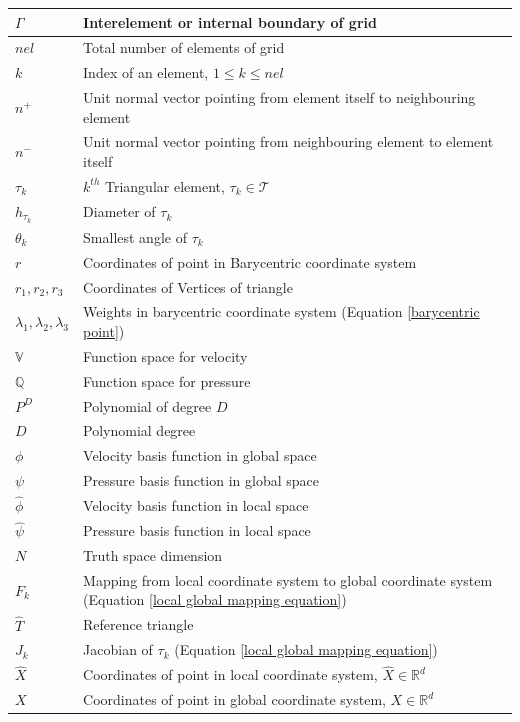 \documentclass[a4paper]{book}
\begin{document}
\begin{longtable}{| p{} | p{} |}
\hline
$\Gamma$ & Interelement or internal boundary of grid\\
\hline
$nel$ & Total number of elements of grid\\
\hline
$k$ & Index of an element, $1\leq k \leq nel$\\
\hline
$n^+$ & Unit normal vector pointing from element itself to neighbouring element\\
\hline
$n^-$ & Unit normal vector pointing from neighbouring element to element itself \\
\hline
$\tau_k$ & $k^{th}$ Triangular element, $\tau_k \in \mathcal{T}$\\
\hline
$h_{\tau_k}$ & Diameter of $\tau_k$\\
\hline
$\theta_k$ & Smallest angle of $\tau_k$\\ 
\hline
$r$ & Coordinates of point in Barycentric coordinate system\\
\hline
$r_1, r_2, r_3$ & Coordinates of Vertices of triangle\\
\hline
$\lambda_1, \lambda_2, \lambda_3$ & Weights in barycentric coordinate system (Equation \ref{barycentric point})\\
\hline
$\mathbb{V}$ & Function space for velocity\\
\hline
$\mathbb{Q}$ & Function space for pressure\\
\hline
$P^D$ & Polynomial of degree $D$\\
\hline
$D$ & Polynomial degree\\
\hline
$\phi$ & Velocity basis function in global space\\
\hline
$\psi$ & Pressure basis function in global space\\
\hline
$\hat{\phi}$ & Velocity basis function in local space\\
\hline
$\hat{\psi}$ & Pressure basis function in local space\\
\hline
$N$ & Truth space dimension\\
\hline
$F_k$ & Mapping from local coordinate system to global coordinate system (Equation \ref{local global mapping equation})\\
\hline
$\hat{T}$ & Reference triangle\\
\hline
$J_k$ & Jacobian of $\tau_k$ (Equation \ref{local global mapping equation})\\
\hline
$\hat{X}$ & Coordinates of point in local coordinate system, $\hat{X} \in \mathbb{R}^d$\\
\hline
$X$ & Coordinates of point in global coordinate system, $X \in \mathbb{R}^d$\\

\end{longtable}
\end{document}
